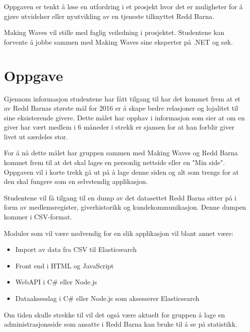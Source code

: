 Oppgaven er tenkt å løse en utfordring i et prosjekt hvor det er muligheter for å gjøre utvidelser eller nyutvikling av en tjeneste tilknyttet Redd Barna.

Making Waves vil stille med faglig veiledning i prosjektet. Studentene kan forvente å jobbe sammen med Making Waves sine eksperter på .NET og søk.

\section{Oppgave}
Gjennom informasjon studentene har fått tilgang til har det kommet frem at et av Redd Barnas største mål for 2016 er å skape bedre relasjoner og lojalitet til sine eksisterende givere. Dette målet har opphav i informasjon som sier at om en giver har vært medlem i 6 måneder i strekk er sjansen for at han forblir giver livet ut særdeles stor.

For å nå dette målet har gruppen sammen med Making Waves og Redd Barna kommet frem til at det skal lages en personlig nettside eller en "Min side". Oppgaven vil i korte trekk gå ut på å lage denne siden og alt som trengs for at den skal fungere som en selvstendig applikasjon.

Studentene vil få tilgang til en dump av det datasettet Redd Barna sitter på i form av medlemsregister, giverhistorikk og kundekommunikasjon. Denne dumpen kommer i CSV-format.

Moduler som vil være nødvendig for en slik applikasjon vil blant annet være:
\begin{itemize}
\item Import av data fra CSV til Elasticsearch
\item Front end i HTML og JavaScript
\item WebAPI i C\# eller Node.js
\item Dataaksesslag i C\# eller Node.js som aksesserer Elasticsearch
\end{itemize}

Om tiden skulle strekke til vil det også være aktuelt for gruppen å lage en administrasjonsside som ansatte i Redd Barna kan bruke til å se på statistikk.